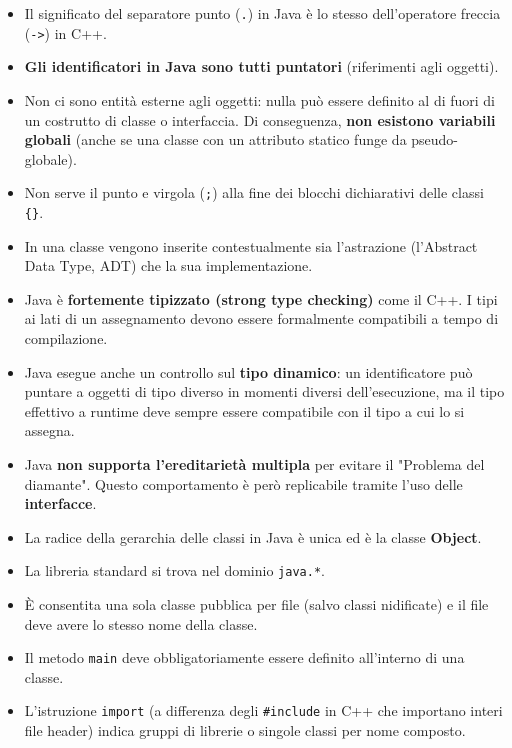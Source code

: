 \documentclass[12pt,a4paper,oneside]{book}
\begin{document}
\begin{itemize}
    \item Il significato del separatore punto (\texttt{.}) in Java è lo stesso dell'operatore freccia (\texttt{->}) in C++.
    \item \textbf{Gli identificatori in Java sono tutti puntatori} (riferimenti agli oggetti).
    \item Non ci sono entità esterne agli oggetti: nulla può essere definito al di fuori di un costrutto di classe o interfaccia. Di conseguenza, \textbf{non esistono variabili globali} (anche se una classe con un attributo statico funge da pseudo-globale).
    \item Non serve il punto e virgola (\texttt{;}) alla fine dei blocchi dichiarativi delle classi \texttt{\{\}}.
    \item In una classe vengono inserite contestualmente sia l'astrazione (l'Abstract Data Type, ADT) che la sua implementazione.
    \item Java è \textbf{fortemente tipizzato (strong type checking)} come il C++. I tipi ai lati di un assegnamento devono essere formalmente compatibili a tempo di compilazione.
    \item Java esegue anche un controllo sul \textbf{tipo dinamico}: un identificatore può puntare a oggetti di tipo diverso in momenti diversi dell'esecuzione, ma il tipo effettivo a runtime deve sempre essere compatibile con il tipo a cui lo si assegna.
    \item Java \textbf{non supporta l'ereditarietà multipla} per evitare il "Problema del diamante". Questo comportamento è però replicabile tramite l'uso delle \textbf{interfacce}.
    \item La radice della gerarchia delle classi in Java è unica ed è la classe \textbf{Object}.
    \item La libreria standard si trova nel dominio \texttt{java.*}.
    \item È consentita una sola classe pubblica per file (salvo classi nidificate) e il file deve avere lo stesso nome della classe.
    \item Il metodo \texttt{main} deve obbligatoriamente essere definito all'interno di una classe.
    \item L'istruzione \texttt{import} (a differenza degli \texttt{\#include} in C++ che importano interi file header) indica gruppi di librerie o singole classi per nome composto.
\end{itemize}
\end{document}
